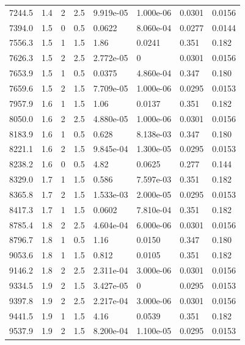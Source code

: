 \documentclass[preview]{standalone}
\begin{document}
{{{\begin{tabular}{L{1.2cm}C{1.2cm} C{0.3cm}C{0.5cm} C{1.4cm}C{1.4cm} C{1.4cm}C{1.4cm}}
  7244.5  &   1.4  & 2     & 2.5 &  9.919e-05  & 1.000e-06  & 0.0301 &  0.0156   \\ 
  7394.0  &   1.5  & 0     & 0.5 &  0.0622  & 8.060e-04  & 0.0277 &  0.0144   \\ 
  7556.3  &   1.5  & 1     & 1.5 &  1.86  & 0.0241  & 0.351 &  0.182   \\ 
  7626.3  &   1.5  & 2     & 2.5 &  2.772e-05  & 0  & 0.0301 &  0.0156   \\ 
  7653.9  &   1.5  & 1     & 0.5 &  0.0375  & 4.860e-04  & 0.347 &  0.180   \\ 
  7659.6  &   1.5  & 2     & 1.5 &  7.709e-05  & 1.000e-06  & 0.0295 &  0.0153   \\ 
  7957.9  &   1.6  & 1     & 1.5 &  1.06  & 0.0137  & 0.351 &  0.182   \\ 
  8050.0  &   1.6  & 2     & 2.5 &  4.880e-05  & 1.000e-06  & 0.0301 &  0.0156   \\ 
  8183.9  &   1.6  & 1     & 0.5 &  0.628  & 8.138e-03  & 0.347 &  0.180   \\ 
  8221.1  &   1.6  & 2     & 1.5 &  9.845e-04  & 1.300e-05  & 0.0295 &  0.0153   \\ 
  8238.2  &   1.6  & 0     & 0.5 &  4.82  & 0.0625  & 0.277 &  0.144   \\ 
  8329.0  &   1.7  & 1     & 1.5 &  0.586  & 7.597e-03  & 0.351 &  0.182   \\ 
  8365.8  &   1.7  & 2     & 1.5 &  1.533e-03  & 2.000e-05  & 0.0295 &  0.0153   \\ 
  8417.3  &   1.7  & 1     & 1.5 &  0.0602  & 7.810e-04  & 0.351 &  0.182   \\ 
  8785.4  &   1.8  & 2     & 2.5 &  4.604e-04  & 6.000e-06  & 0.0301 &  0.0156   \\ 
  8796.7  &   1.8  & 1     & 0.5 &  1.16  & 0.0150  & 0.347 &  0.180   \\ 
  9053.6  &   1.8  & 1     & 1.5 &  0.812  & 0.0105  & 0.351 &  0.182   \\ 
  9146.2  &   1.8  & 2     & 2.5 &  2.311e-04  & 3.000e-06  & 0.0301 &  0.0156   \\ 
  9334.5  &   1.9  & 2     & 1.5 &  3.427e-05  & 0  & 0.0295 &  0.0153   \\ 
  9397.8  &   1.9  & 2     & 2.5 &  2.217e-04  & 3.000e-06  & 0.0301 &  0.0156   \\ 
  9441.5  &   1.9  & 1     & 1.5 &  4.16  & 0.0539  & 0.351 &  0.182   \\ 
  9537.9  &   1.9  & 2     & 1.5 &  8.200e-04  & 1.100e-05  & 0.0295 &  0.0153   \\ 

\end{tabular}}}}
\end{document}
